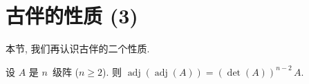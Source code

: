 





\section{古伴的性质 (3)}

本节, 我们再认识古伴的二个性质.

\begin{theorem}
    设 \(A\) 是 \(n\)~级阵 (\(n \geq 2\)).
    则
    \(\operatorname{adj} {(\operatorname{adj} {(A)})}
    = (\det {(A)})^{n-2}\,A\).
\end{theorem}

